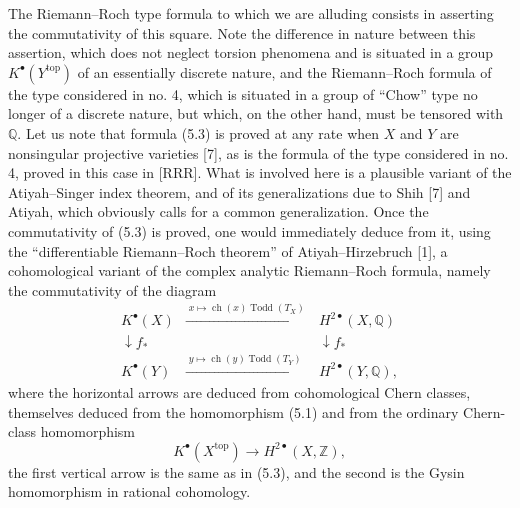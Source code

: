 \documentclass[11pt]{article}
\newcommand{\ch}{\operatorname{ch}}
\newcommand{\Todd}{\operatorname{Todd}}
\providecommand{\ch}{\operatorname{ch}}
\providecommand{\Todd}{\operatorname{Todd}}
\begin{document}
The Riemann--Roch type formula to which we are alluding consists in asserting the commutativity of this square. Note the difference in nature between this assertion, which does not neglect torsion phenomena and is situated in a group $K^\bullet(Y^{\mathrm{top}})$ of an essentially discrete nature, and the Riemann--Roch formula of the type considered in no. 4, which is situated in a group of ``Chow'' type no longer of a discrete nature, but which, on the other hand, must be tensored with $\mathbb Q$. Let us note that formula (5.3) is proved at any rate when $X$ and $Y$ are nonsingular projective varieties [7], as is the formula of the type considered in no. 4, proved in this case in [RRR]. What is involved here is a plausible variant of the Atiyah--Singer index theorem, and of its generalizations due to Shih [7] and Atiyah, which obviously calls for a common generalization. Once the commutativity of (5.3) is proved, one would immediately deduce from it, using the ``differentiable Riemann--Roch theorem'' of Atiyah--Hirzebruch [1], a cohomological variant of the complex analytic Riemann--Roch formula, namely the commutativity of the diagram
\begin{equation}\tag{5.4}
\begin{array}{ccc}
K^\bullet(X) & \xrightarrow{\;x\mapsto \ch(x)\Todd(T_X)\;} & H^{2\bullet}(X,\mathbb Q) \\
\downarrow f_* && \downarrow f_* \\
K^\bullet(Y) & \xrightarrow{\;y\mapsto \ch(y)\Todd(T_Y)\;} & H^{2\bullet}(Y,\mathbb Q),
\end{array}
\end{equation}
where the horizontal arrows are deduced from cohomological Chern classes, themselves deduced from the homomorphism (5.1) and from the ordinary Chern-class homomorphism
\[
K^\bullet(X^{\mathrm{top}})\longrightarrow H^{2\bullet}(X,\mathbb Z),
\]
the first vertical arrow is the same as in (5.3), and the second is the Gysin homomorphism in rational cohomology.
\end{document}
